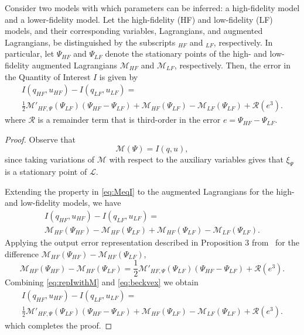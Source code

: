 \begin{proposition}
Consider two models with which parameters can be inferred: a high-fidelity model and a lower-fidelity model. Let the high-fidelity (HF) and low-fidelity (LF) models, and their corresponding variables, Lagrangians, and augmented Lagrangians, be distinguished by the subscripts $_{HF}$ and $_{LF}$, respectively. In particular, let $\Psi_{HF}$ and $\Psi_{LF}$ denote the stationary points of the high- and low- fidelity augmented Lagrangians $\mathcal{M}_{HF}$ and $\mathcal{M}_{LF}$, respectively. 
Then, the error in the Quantity of Interest $I$ is given by
%
\begin{multline}
\label{eq:semifinErrExp}
I(q_{HF},u_{HF})-I(q_{LF},u_{LF})=\\\frac{1}{2}\mathcal{M}'_{HF,\Psi}(\Psi_{LF})(\Psi_{HF}-\Psi_{LF})+\mathcal{M}_{HF}(\Psi_{LF})-\mathcal{M}_{LF}(\Psi_{LF})+\mathcal{R}(e^3)\textrm{.}
\end{multline}
%
where $\mathcal{R}$ is a remainder term that is third-order in the error $e=\Psi_{HF}-\Psi_{LF}$.
\end{proposition}
%
\begin{proof}
%
Observe that
%
\begin{equation}
\label{eq:MeqI}
\mathcal{M}(\Psi)=I(q,u),
\end{equation}
%
since taking variations of $\mathcal{M}$ with respect to the auxiliary variables gives that $\xi_\Psi$ is a stationary point of $\mathcal{L}$.

Extending the property in \cref{eq:MeqI} to the augmented Lagrangians for the high- and low-fidelity models, we have
%
\begin{multline}
\label{eq:repIwithM}
I(q_{HF},u_{HF})-I(q_{LF},u_{LF})=\\\mathcal{M}_{HF}(\Psi_{HF})-\mathcal{M}_{HF}(\Psi_{LF})+\mathcal{M}_{HF}(\Psi_{LF})-\mathcal{M}_{LF}(\Psi_{LF})\textrm{.}
\end{multline}
%
Applying the output error representation described in Proposition 3 from~\cite{BecVex05} for the difference $\mathcal{M}_{HF}(\Psi_{HF})-\mathcal{M}_{HF}(\Psi_{LF})$,
\begin{equation}
\label{eq:beckvex}
\mathcal{M}_{HF}(\Psi_{HF})-\mathcal{M}_{HF}(\Psi_{LF}) = \frac{1}{2}\mathcal{M}'_{HF,\Psi}(\Psi_{LF})(\Psi_{HF}-\Psi_{LF})+\mathcal{R}(e^3)\textrm{.}
\end{equation}
Combining \cref{eq:repIwithM} and \cref{eq:beckvex} we obtain
\begin{multline}
\label{eq:preadj}
I(q_{HF},u_{HF})-I(q_{LF},u_{LF})=\\\frac{1}{2}\mathcal{M}'_{HF,\Psi}(\Psi_{LF})(\Psi_{HF}-\Psi_{LF})+\mathcal{M}_{HF}(\Psi_{LF})-\mathcal{M}_{LF}(\Psi_{LF})+\mathcal{R}(e^3)\textrm{.}
\end{multline}
which completes the proof.
\end{proof}
%

